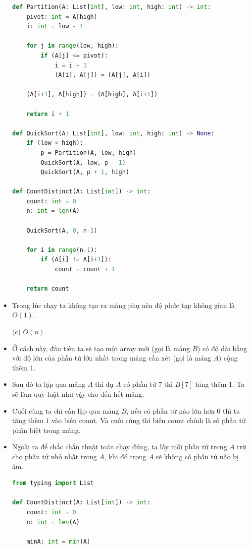 \documentclass[12pt]{article}
\begin{document}
\begin{itemize}
\begin{lstlisting}[language=Python]
def Partition(A: List[int], low: int, high: int) -> int:
    pivot: int = A[high]
    i: int = low - 1

    for j in range(low, high):
        if (A[j] <= pivot):
            i = i + 1
            (A[i], A[j]) = (A[j], A[i])

    (A[i+1], A[high]) = (A[high], A[i+1])

    return i + 1

def QuickSort(A: List[int], low: int, high: int) -> None:
    if (low < high):
        p = Partition(A, low, high)
        QuickSort(A, low, p - 1)
        QuickSort(A, p + 1, high)

def CountDistinct(A: List[int]) -> int:
    count: int = 0
    n: int = len(A)

    QuickSort(A, 0, n-1)

    for i in range(n-1):
        if (A[i] != A[i+1]):
            count = count + 1

    return count
\end{lstlisting}

\item Trong lúc chạy ta không tạo ra mảng phụ nên độ phức tạp không gian là $O(1)$.

\item[(c)] $O(n)$.

\item Ở cách này, đầu tiên ta sẽ tạo một array mới (gọi là mảng $B$) có độ dài bằng với độ lớn của phần tử lớn nhất trong mảng cần xét (gọi là mảng $A$) cộng thêm 1.

\item Sau đó ta lặp qua mảng $A$ thí dụ $A$ có phần tử $7$ thì $B[7]$ tăng thêm 1. Ta sẽ làm quy luật như vậy cho đến hết mảng. 

\item Cuối cùng ta chỉ cần lặp qua mảng $B$, nếu có phần tử nào lớn hơn $0$ thì ta tăng thêm $1$ vào biến count. Và cuối cùng thì biến count chính là số phần tử phân biệt trong mảng.

\item Ngoài ra để chắc chắn thuật toán chạy đúng, ta lấy mỗi phần tử trong $A$ trừ cho phần tử nhỏ nhất trong $A$, khi đó trong $A$ sẽ không có phần tử nào bị âm.

\begin{lstlisting}[language=Python]
from typing import List

def CountDistinct(A: List[int]) -> int:
    count: int = 0
    n: int = len(A)

    minA: int = min(A)


\end{lstlisting}
\end{itemize}
\end{document}
